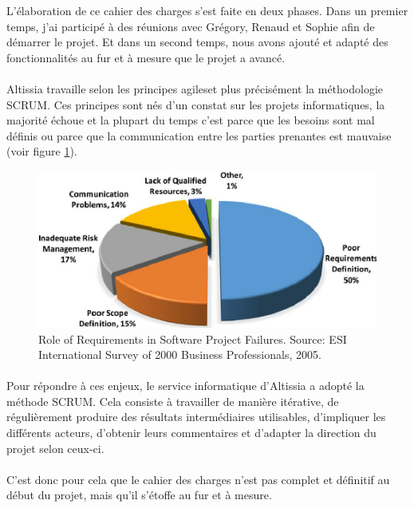 L'élaboration de ce cahier des charges s'est faite en deux phases. 
Dans un premier temps, j'ai participé à des réunions avec Grégory, Renaud et Sophie afin de démarrer le projet. 
Et dans un second temps, nous avons ajouté et adapté des fonctionnalités au fur et à mesure que le projet a avancé.

\paragraph{}
Altissia travaille selon les principes agiles\fnmark et plus précisément la méthodologie SCRUM\fnmark.
Ces principes sont nés d'un constat sur les projets informatiques, la majorité échoue\cite{standish_standish_nodate} et la plupart du temps c'est parce que les besoins sont mal définis ou parce que la communication entre les parties prenantes est mauvaise (voir figure \ref{fig:why-projects-fails}).

\begin{figure}[ht]
    \centering
    \includegraphics[scale=.8]{images/why-projects-fail.png}
    \caption{Role of Requirements in Software Project Failures. Source: ESI International Survey of 2000 Business Professionals, 2005.}
    \label{fig:why-projects-fails}
\end{figure}


\paragraph{}
Pour répondre à ces enjeux, le service informatique d'Altissia a adopté la méthode SCRUM.
Cela consiste à travailler de manière itérative, de régulièrement produire des résultats intermédiaires utilisables, d'impliquer les différents acteurs, d'obtenir leurs commentaires et d'adapter la direction du projet selon ceux-ci.

\paragraph{}
C'est donc pour cela que le cahier des charges n'est pas complet et définitif au début du projet, mais qu'il s'étoffe au fur et à mesure.
